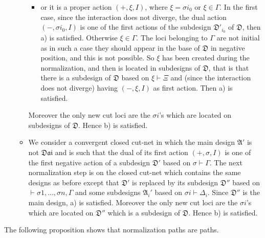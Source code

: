 \documentclass{LMCS}
\newcommand{\design}[1]{{\mathfrak{#1}}}
\newcommand{\dai}{\design{Dai}}
\begin{document}
\begin{enumerate}
\begin{itemize}
\begin{itemize}
\item or it is a proper action $(+,\xi,I)$, where $\xi=\sigma {i_0}$ or $\xi\in\Gamma$. In the first case, since the interaction does not diverge, the dual action $(-,\sigma {i_0},I)$ is one of the first actions of the subdesign $\design{D}'_{i_0}$ of $\design{D}$, then a) is satisfied. Otherwise $\xi\in\Gamma$. The loci belonging to $\Gamma$ are not initial as in such a case they should appear in the base of $\design{D}$ in negative position, and this is not possible. So $\xi$ has been created during the normalization, and then is located in   subdesigns of $\design{D}$, that is that there is a subdesign of $\design{D}$ based on $\xi\vdash\Xi$ and (since the interaction does not diverge) having $(-,\xi,I)$ as first action. Then a) is satisfied. 
\end{itemize}
Moreover the only new cut loci are the $\sigma {i}$'s which are located on subdesigns of $\design{D}$. Hence b) is satisfied.
\item We consider a convergent closed cut-net in which the main design $\design{A}'$ is not $\dai$ and is such that the dual of its first action $(+,\sigma,I)$ is one of the first negative action of a subdesign $\design{D}'$ based on $\sigma\vdash\Gamma$.  The next normalization step is on the closed cut-net which contains the same designs as before except that $\design{D}'$ is replaced by its subdesign $\design{D}''$ based on $\vdash\sigma 1,\dots,\sigma n,\Gamma$ and some subdesigns $\design{A}_i'$ based on $\sigma i\vdash\Delta_i$. Since $\design{D}''$ is the main design, a) is satisfied. Moreover the only new cut loci are the $\sigma {i}$'s which are located on $\design{D}''$ which is a subdesign of $\design{D}$. Hence b) is satisfied.
\end{itemize}
\end{enumerate}

The following proposition shows that normalization paths are paths.
 
\end{document}
